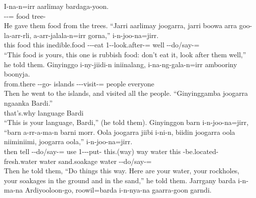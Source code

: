 \begin{exye}
\exy {}
\gll I-na-n=irr aarlimay bardaga-yoon.\\
--= food tree-\\
\ft He gave them food from the trees.
\exy {}
\gll ``Jarri aarlimay joogarra, jarri boowa arra goo-la-arr-rli, a-arr-jalala-n=irr gorna,'' i-n-joo-na=jirr.\\
this food  this inedible.food  ---eat 1--look.after-= well --do/say-=\\
\ft ``This food is yours, this one is rubbish food: don't eat it, look after them well,'' he told them.
\exy {}
\gll Ginyinggo i-ny-jiidi-n iniinalang, i-na-ng-gala-n=irr ambooriny boonyja.\\
from.there --go- islands ---visit-= people everyone\\
\ft Then he went to the islands, and visited all the people.
\exy {}
\gll ``Ginyinggamba joogarra ngaanka Bardi.''\\
that's.why  language Bardi\\
\ft ``This is your language, Bardi,'' (he told them).
\exy {}
\gll Ginyinggon barn i-n-joo-na=jirr, ``barn a-rr-a-ma-n barni morr. Oola joogarra jiibi i-ni-n, biidin joogarra oola niiminiimi, joogarra oola,'' i-n-joo-na=jirr.\\
then tell --do/say-= use 1---put- this.(way) way water  this -be.located- fresh.water  water sand.soakage  water --do/say-=\\
\ft Then he told them, ``Do things this way. Here are your water, your rockholes, your soakages in the ground and in the sand,'' he told them.%
\exy {}
\gll Jarrgany barda i-n-ma-na Ardiyooloon-go, roowil=barda i-n-nya-na gaarra-goon garndi.\\

\end{exye}
